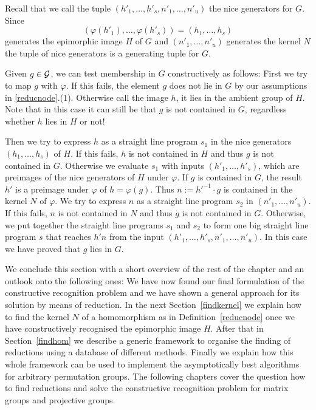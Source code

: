 Recall that we call the tuple $(h'_1, \ldots, h'_s, n'_1, \ldots, n'_u)$
the nice generators for $G$. Since 
%
\[ (\varphi(h'_1), \ldots, \varphi(h'_s))
= (h_1, \ldots, h_s) \] 
generates the epimorphic image $H$ of $G$ and
$(n'_1, \ldots, n'_u)$ generates the kernel $N$ the tuple of nice
generators is a generating tuple for $G$.

Given $g \in \mathcal{G}$, we can test membership in $G$ constructively as follows:
First we try to map $g$ with $\varphi$. If this fails, the element $g$
does not lie in $G$ by our assumptions in \ref{reducnode}.(1). Otherwise
call the image $h$, it lies in the ambient group of $H$. 
Note that in this case it can still be that
$g$ is not contained in $G$, regardless whether $h$ lies in $H$ or not! 

Then we try to express $h$ as a straight 
line program $s_1$ in the nice generators $(h_1, \ldots, h_s)$ of $H$. If this
%
fails, $h$ is not contained in $H$ and thus $g$ is not contained in
$G$. Otherwise we evaluate $s_1$ with inputs
$(h'_1, \ldots, h'_s)$, which are preimages of the nice generators of $H$ under
$\varphi$. If $g$ is contained in $G$, the result $h'$ is a preimage 
under $\varphi$ of $h = \varphi(g)$. Thus $n := h'^{-1}\cdot g$ is contained
in the kernel $N$ of $\varphi$. We try to express $n$ as a straight
line program $s_2$ in $(n'_1, \ldots, n'_u)$. If this fails, $n$
%
is not contained in $N$ and thus $g$ is not contained in $G$. Otherwise,
we put together the straight line programs $s_1$ and $s_2$ to form
one big straight line program $s$ that reaches $h'n$ from the input 
%
$(h'_1, \ldots, h'_s, n'_1, \ldots, n'_u)$. In this case we have proved
that $g$ lies in $G$.
\proofend

\medskip
We conclude this section with a short overview of the rest of the chapter
and an outlook onto the following ones:
We have now found our final formulation of the constructive
recognition problem and we have shown a general approach for its solution
by means of reduction. In the next Section~\ref{findkernel} we explain how
to find the kernel $N$ of a homomorphism as in Definition~\ref{reducnode}
once we have constructively recognised the epimorphic image $H$. After that
in Section~\ref{findhom} we describe a generic framework to organise the
finding of reductions using a database of different methods. Finally we
explain how this whole framework can be used to implement the
asymptotically best algorithms for arbitrary permutation groups.
The following chapters cover the question how to find reductions
and solve the constructive recognition problem for matrix groups and
projective groups.

